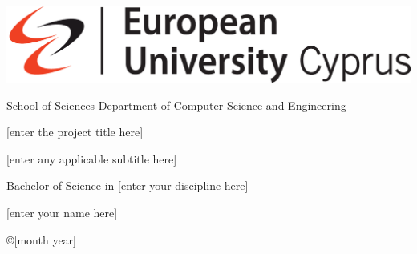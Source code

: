 \thispagestyle{empty}
{

\noindent\includegraphics[scale=0.32]{images/euc.jpg}


\begin{center}
 School of Sciences \textbar \; Department of Computer Science and Engineering
\end{center}

\vspace{1.5cm}
\begin{center}
\Huge  [enter the project title here]
\end{center}


\vspace{0.2cm}
\begin{center}
\Large [enter any applicable subtitle here]
\end{center}

\vspace{1.5cm}
\begin{center}\LARGE Bachelor of Science in [enter your discipline here]
\end{center}


\vspace{1.5cm}
\begin{center}
\Large [enter your name here]
\end{center}
\vspace{1.5cm}

\noindent
\begin{center}\copyright  [month year]
\end{center}
\newpage
\thispagestyle{empty}

}%